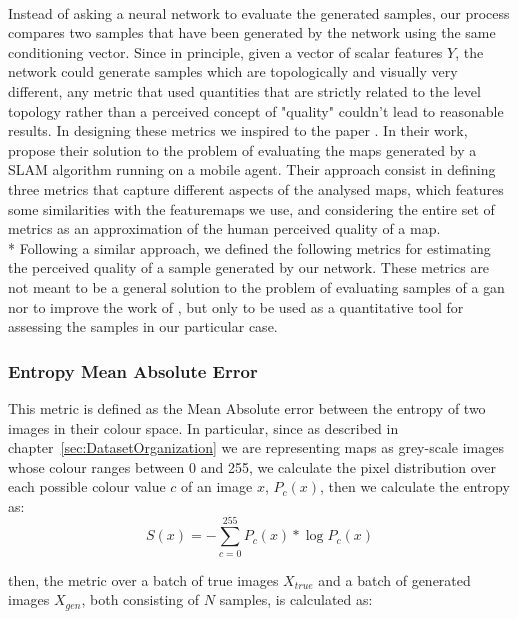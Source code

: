 \paragraph{} Instead of asking a neural network to evaluate the generated samples, our process compares two samples that have been generated by the network using the same conditioning vector. Since in principle, given a vector of scalar features $Y$, the network could generate samples which are topologically and visually very different, any metric that used quantities that are strictly related to the level topology rather than a perceived concept of "quality" couldn't lead to reasonable results. In designing these metrics we inspired to the paper . In their work, \citeauthor{slam} propose their solution to the problem of evaluating the maps generated by a SLAM algorithm running on a mobile agent. Their approach consist in defining three metrics that capture different aspects of the analysed maps, which features some similarities with the \glspl{featuremap} we use, and considering the entire set of metrics as an approximation of the human perceived quality of a map. 
\\* Following a similar approach, we defined the following metrics for estimating the perceived quality of a sample generated by our network. These metrics are not meant to be a general solution to the problem of evaluating samples of a \gls{gan} nor to improve the work of \citeauthor{slam_metrics}, but only to be used as a quantitative tool for assessing the samples in our particular case.

\subsubsection{Entropy Mean Absolute Error}
\label{sec:entropy_MAE}
This metric is defined as the Mean Absolute error between the entropy of two images in their colour space. In particular, since as described in chapter~\ref{sec:DatasetOrganization} we are representing maps as grey-scale images whose colour ranges between 0 and 255, we calculate the pixel distribution over each possible colour value $c$ of an image $x$, $P_{c}(x)$, then we calculate the entropy as:
\begin{equation}
S(x) = - \sum_{c=0}^{255}{ P_{c}(x) * \log{P_{c}(x)} }
\end{equation}

then, the metric over a batch of true images $X_{true}$ and a batch of generated images $X_{gen}$, both consisting of $N$ samples, is calculated as:

